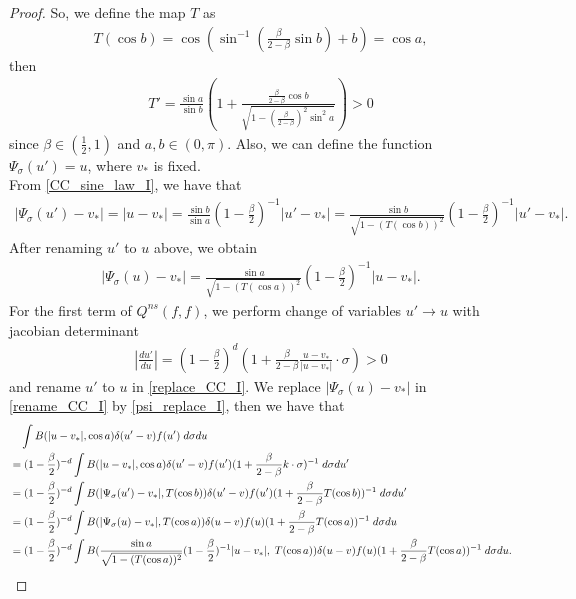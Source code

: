 \documentclass[reqno,10pt]{amsart}
\numberwithin{equation}{section}
\begin{document}
\begin{proof}
\noindent So, we define the map $T$ as
\begin{align} \label{CC_T_I}
    T(\cos b) = \cos(\sin^{-1}(\frac{\beta}{2-\beta}\sin b)+b) = \cos a, 
\end{align} then 
\begin{align*}
    T' = \frac{\sin a}{\sin b}(1+\frac{\frac{\beta}{2-\beta}\cos b}{\sqrt{1-(\frac{\beta}{2-\beta})^{2}\sin^{2}a}})>0 
\end{align*} since $\beta \in (\frac{1}{2},1)$ and $a,b \in (0,\pi).$ Also, we can define the function $\Psi_\sigma(u')=u$, where $v_*$ is fixed.\\ From \eqref{CC_sine_law_I}, we have that
\begin{align*}
    |\Psi_\sigma(u')-v_*|=|u-v_*|=\frac{\sin b}{\sin a}(1-\frac{\beta}{2})^{-1}|u'-v_*|=\frac{\sin b}{\sqrt{1-(T(\cos b))^2}}(1-\frac{\beta}{2})^{-1}|u'-v_*|. 
\end{align*} After renaming $u'$ to $u$ above, we obtain
\begin{align} \label{psi_replace_I}
    |\Psi_\sigma(u)-v_*|=\frac{\sin a}{\sqrt{1-(T(\cos a))^2}}(1-\frac{\beta}{2})^{-1}|u-v_*|.
\end{align} 
For the first term of $Q^{ns}(f,f)$, we perform change of variables $u' \rightarrow u$ with jacobian determinant 
\begin{align*}
|\frac{du'}{du}|=(1-\frac{\beta}{2})^{d}(1+\frac{\beta}{2-\beta}\frac{u-v_*}{|u-v_*|}\cdot \sigma)>0 
\end{align*}
and rename $u'$ to $u$ in \eqref{replace_CC_I}. We replace $|\Psi_\sigma(u)-v_*|$ in \eqref{rename_CC_I} by \eqref{psi_replace_I}, then we have that 
\begin{align} 
    & \quad \int B(|u-v_*|,\cos a) \delta(u'-v)f(u') \;d\sigma du \label{B_CC_I} \\
     &= (1-\frac{\beta}{2})^{-d}\int B(|u-v_*|,\cos a)\delta(u'-v)f(u')(1+\frac{\beta}{2-\beta}k\cdot \sigma)^{-1} \;d\sigma du' \notag \\ 
    &= (1-\frac{\beta}{2})^{-d}\int B(|\Psi_\sigma(u')-v_*|,T(\cos b)) \delta(u'-v)f(u')(1+\frac{\beta}{2-\beta}T(\cos b))^{-1} \;d\sigma du'  \label{replace_CC_I}\\
    &=(1-\frac{\beta}{2})^{-d}\int B(|\Psi_\sigma(u)-v_*|,T(\cos a)) \delta(u-v)f(u)(1+\frac{\beta}{2-\beta}T(\cos a))^{-1} \;d\sigma du \label{rename_CC_I} \\
    &=(1-\frac{\beta}{2})^{-d}\int B(\frac{\sin a}{\sqrt{1-(T(\cos a))^2}}(1-\frac{\beta}{2})^{-1}|u-v_*|,\;T(\cos a)) \delta(u-v)f(u)(1+\frac{\beta}{2-\beta}T(\cos a))^{-1} \;d\sigma du. \label{put_B_CC_I}

\end{align}
\end{proof}
\end{document}
